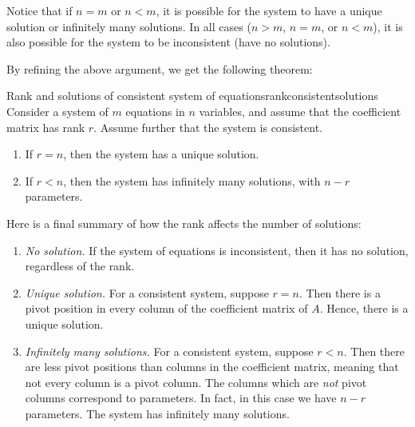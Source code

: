 Notice that if $n=m$ or $n<m$, it is possible for the system to have a
unique solution or infinitely many solutions. In all cases ($n>m$,
$n=m$, or $n<m$), it is also possible for the system to be
inconsistent (have no solutions).

By refining the above argument, we get the following theorem:

\begin{theorem}{Rank and solutions of consistent system of equations}{rankconsistentsolutions}
  Consider a system of $m$ equations in $n$ variables, and assume that
  the coefficient matrix has rank $r$. Assume further that the system
  is consistent.
\begin{enumerate}
\item If $r=n$, then the system has a unique solution.
\item If $r<n$, then the system has infinitely many solutions, with $n-r$ parameters.
\end{enumerate}
\end{theorem}

Here is a final summary of how the rank affects the number of
solutions:

\begin{enumerate}
\item {\em No solution.} If the system of equations is inconsistent,
  then it has no solution, regardless of the rank.

\item {\em Unique solution.} For a consistent system, suppose
  $r=n$. Then there is a pivot position in every column of the
  coefficient matrix of $A$. Hence, there is a unique solution.

\item {\em Infinitely many solutions.} For a consistent system, suppose
  $r<n$. Then there are less pivot positions than columns in the
  coefficient matrix, meaning that not every column is a pivot
  column. The columns which are {\em not} pivot columns correspond to
  parameters. In fact, in this case we have $n-r$ parameters. The
  system has infinitely many solutions.
\end{enumerate}
